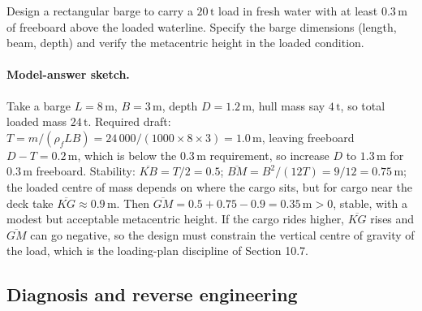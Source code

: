 \begin{exercise}
Design a rectangular barge to carry a $20\,\si{\tonne}$ load
in fresh water with at least $0.3\,\si{\meter}$ of freeboard
above the loaded waterline. Specify the barge dimensions
(length, beam, depth) and verify the metacentric height in the
loaded condition.

\paragraph{Model-answer sketch.} Take a barge $L = 8\,\si{\meter}$,
$B = 3\,\si{\meter}$, depth $D = 1.2\,\si{\meter}$, hull mass say
$4\,\si{\tonne}$, so total loaded mass $24\,\si{\tonne}$. Required draft:
$T = m/(\rho_f LB) = 24\,000/(1000 \times 8 \times 3) = 1.0\,\si{\meter}$,
leaving freeboard $D - T = 0.2\,\si{\meter}$, which is below the
$0.3\,\si{\meter}$ requirement, so increase $D$ to $1.3\,\si{\meter}$ for
$0.3\,\si{\meter}$ freeboard. Stability: $\overline{KB} = T/2 = 0.5$;
$\overline{BM} = B^2/(12T) = 9/12 = 0.75\,\si{\meter}$; the loaded
centre of mass depends on where the cargo sits, but for cargo near the
deck take $\overline{KG} \approx 0.9\,\si{\meter}$. Then
$\overline{GM} = 0.5 + 0.75 - 0.9 = 0.35\,\si{\meter} > 0$, stable, with
a modest but acceptable metacentric height. If the cargo rides higher,
$\overline{KG}$ rises and $\overline{GM}$ can go negative, so the design
must constrain the vertical centre of gravity of the load, which is the
loading-plan discipline of Section 10.7.
\end{exercise}

\subsection*{Diagnosis and reverse engineering}

